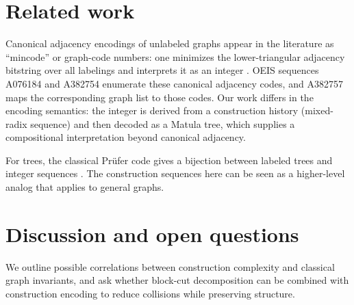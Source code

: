 \documentclass[11pt]{article}
\begin{document}
\section{Related work}
Canonical adjacency encodings of unlabeled graphs appear in the literature as
``mincode'' or graph-code numbers: one minimizes the lower-triangular adjacency
bitstring over all labelings and interprets it as an integer
\cite{harary1970,parthasarathy2002}. OEIS sequences A076184 and A382754
enumerate these canonical adjacency codes, and A382757 maps the corresponding
graph list to those codes. Our work differs in the encoding semantics: the
integer is derived from a construction history (mixed-radix sequence) and then
decoded as a Matula tree, which supplies a compositional interpretation beyond
canonical adjacency.
\par
For trees, the classical Prüfer code gives a bijection between labeled trees and
integer sequences \cite{west2001}. The construction sequences here can be seen
as a higher-level analog that applies to general graphs.

\section{Discussion and open questions}
We outline possible correlations between construction complexity and classical
graph invariants, and ask whether block-cut decomposition can be combined with
construction encoding to reduce collisions while preserving structure.



\end{document}
